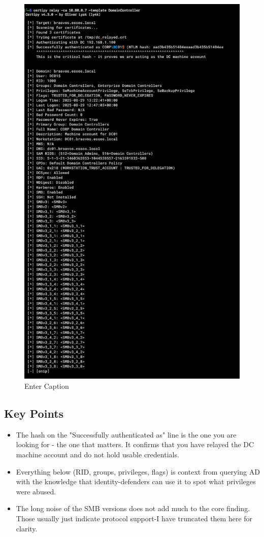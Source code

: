     \begin{figure}
        \centering
        \includegraphics[width=0.75\linewidth]{certipy6.png}
        \caption{Enter Caption}
        \label{fig:placeholder}
    \end{figure}
\begin{notebox}
\subsection{Key Points}
\begin{itemize}
    \item The hash on the "Successfully authenticated as" line is the one you are looking for - the one that matters. It confirms that you have relayed the DC machine account and do not hold usable credentials.
    \item Everything below (RID, groups, privileges, flags) is context from querying AD with the knowledge that identity-defenders can use it to spot what privileges were abused.
    \item The long noise of the SMB versions does not add much to the core finding. Those usually just indicate protocol support-I have truncated them here for clarity.
    \end{itemize}
\end{notebox}

